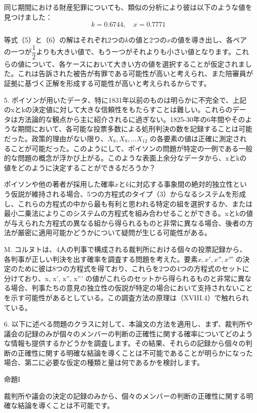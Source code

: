 \documentclass[a4paper,11pt,openany]{ltjsbook}
\begin{document}
同じ期間における財産犯罪についても、類似の分析により彼は以下のような値を見つけました：
\[
k = 0.6744, \quad x = 0.7771
\]

等式（5）と（6）の解はそれぞれ2つの$k$の値と2つの$x$の値を導き出し、各ペアの一つが$\dfrac{1}{2}$よりも大きい値で、もう一つがそれよりも小さい値となります。これらの値について、各ケースにおいて大きい方の値を選択することが仮定されました。これは告訴された被告が有罪である可能性が高いと考えられ、また陪審員が証拠に基づく正解を形成する可能性が高いと考えられるからです。

5. ポイソンが用いたデータ、特に1831年以前のものは明らかに不完全で、上記のxとkの決定値に対して大きな信頼性をもたらすことは難しい。これらのデータは方法論的な観点から主に紹介されるに過ぎない。1825-30年の6年間やそのような期間において、各可能な投票多数による処刑判決の数を記録することは可能だった。政策的理由がない限り、$X_8, X_9, \dotsc X_{12}$ の各要素の値は正確に測定されることが可能だった。このようにして、ポイソンの問題が特定の一例である一般的な問題の概念が浮かび上がる。このような表面上余分なデータから、xとkの値をどのように決定することができるだろうか？

ポイソンや他の著者が採用した確率$x$と$k$に対応する事象間の絶対的独立性という仮説が維持される場合、5つの方程式のタイプ（3）からなるシステムを形成し、これらの方程式の中から最も有利と思われる特定の組を選択するか、または最小二乗法によりこのシステムの方程式を組み合わせることができる。xとkの値が与えられた方程式の異なる組から得られるものと非常に異なる場合、後者の方法が厳密に適用可能かどうかについて疑問が生じる可能性がある。

M. コルヌトは、4人の判事で構成される裁判所における個々の投票記録から、各判事が正しい判決を出す確率を調査する問題を考えた。要素$x, x', x'', x'''$ の決定のために彼は8つの方程式を得ており、これらを2つの4つの方程式のセットに分けており、x, x', x'', x''' の値がこれらのセットから得られるものと非常に異なる場合、判事たちの意見の独立性の仮説が特定の場合において支持されないことを示す可能性があるとしている。この調査方法の原理は（XVIII.4）で触れられている。

6. 以下に述べる問題のクラスに対して、本論文の方法を適用し、まず、裁判所や議会の記録のみが個々のメンバーの判断の正確性に関する確率についてどのような情報も提供するかどうかを調査します。その結果、それらの記録から個々の判断の正確性に関する明確な結論を導くことは不可能であることが明らかになった場合、第二に必要な仮定の種類と量は何であるかを検討します。

\centerline{\textsc{命題I}}

裁判所や議会の決定の記録のみから、個々のメンバーの判断の正確性に関する明確な結論を導くことは不可能です。
\end{document}
